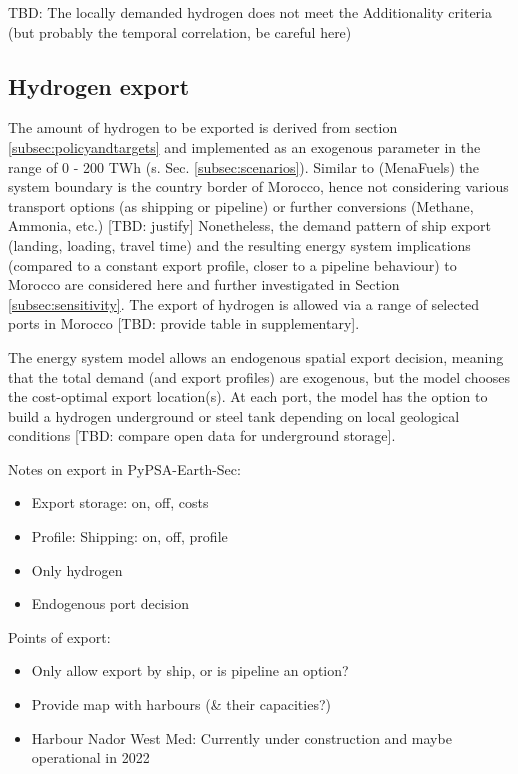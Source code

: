 TBD: The locally demanded hydrogen does not meet the Additionality criteria (but probably the temporal correlation, be careful here)

\subsection{Hydrogen export}
\label{subsec:hydrogen_export}
The amount of hydrogen to be exported is derived from section \ref{subsec:policyandtargets} and implemented as an exogenous parameter in the range of 0 - 200 TWh (s. Sec. \ref{subsec:scenarios}). Similar to (MenaFuels) \cite{Ersoy2022} the system boundary is the country border of Morocco, hence not considering various transport options (as shipping or pipeline) or further conversions (Methane, Ammonia, etc.) [TBD: justify]
Nonetheless, the demand pattern of ship export (landing, loading, travel time) and the resulting energy system implications (compared to a constant export profile, closer to a pipeline behaviour) to Morocco are considered here and further investigated in Section \ref{subsec:sensitivity}.
The export of hydrogen is allowed via a range of selected ports in Morocco [TBD: provide table in supplementary]. 

The energy system model allows an endogenous spatial export decision, meaning that the total demand (and export profiles) are exogenous, but the model chooses the  cost-optimal export location(s). At each port, the model has the option to build a hydrogen underground or steel tank depending on local geological conditions [TBD: compare open data for underground storage].

Notes on export in PyPSA-Earth-Sec:
\begin{itemize}
    \item Export storage: on, off, costs
    \item Profile: Shipping: on, off, profile
    \item Only hydrogen
    \item Endogenous port decision
\end{itemize}

Points of export:
\begin{itemize}
    \item Only allow export by ship, or is pipeline an option?
    \item Provide map with harbours (\& their capacities?)
    \item Harbour Nador West Med: Currently under construction and maybe operational in 2022 \cite{Ersoy2022}
\end{itemize}


